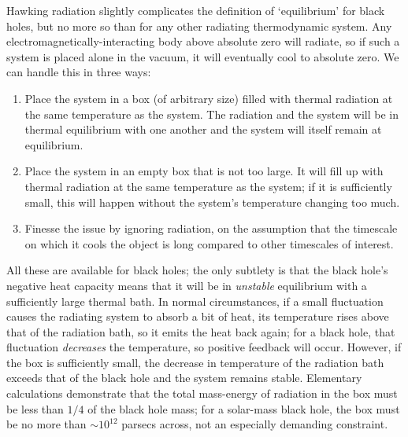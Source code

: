 \documentclass[12pt]{article}
\begin{document}
Hawking radiation slightly complicates the definition of `equilibrium' for black holes, but no more so than for any other radiating thermodynamic system. Any electromagnetically-interacting body above absolute zero will radiate, so if such a system is placed alone in the vacuum, it will eventually cool to absolute zero. We can handle this in three ways:
\begin{enumerate}
\item Place the system in a box (of arbitrary size) filled with thermal radiation at the same temperature as the system. The radiation and the system will be in thermal equilibrium with one another and the system will itself remain at equilibrium.
\item Place the system in an empty box that is not too large. It will fill up with thermal radiation at the same temperature as the system; if it is sufficiently small, this will happen without the system's temperature changing too much.
\item Finesse the issue by ignoring radiation, on the assumption that the timescale on which it cools the object is long compared to other timescales of interest.
\end{enumerate}
All these are available for black holes; the only subtlety is that the black hole's negative heat capacity means that it will be in \emph{unstable} equilibrium with a sufficiently large thermal bath. In normal circumstances, if a small fluctuation causes the radiating system to absorb a bit of heat, its temperature rises above that of the radiation bath, so it emits the heat back again; for a black hole, that fluctuation \emph{decreases} the temperature, so positive feedback will occur. However, if the box is sufficiently small, the decrease in temperature of the radiation bath exceeds that of the black hole and the system remains stable. Elementary calculations \cite{hawking1976} demonstrate that the total mass-energy of radiation in the box must be less than $1/4$ of the black hole mass; for a solar-mass black hole, the box must be no more than $\sim 10^{12}$ parsecs across, not an especially demanding constraint.
\end{document}
